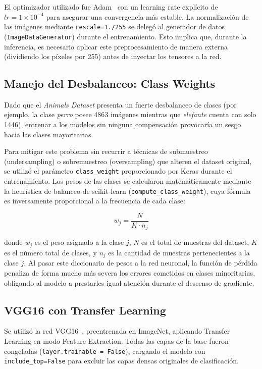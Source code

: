 \documentclass[1p,12pt]{elsarticle}
\begin{document}
El optimizador utilizado fue Adam~\cite{Kingma2015} con un learning rate
explícito de $lr = 1 \times 10^{-4}$ para asegurar una convergencia más
estable. La normalización de las imágenes mediante
\texttt{rescale=1./255} se delegó al generador de datos
(\texttt{ImageDataGenerator}) durante el entrenamiento. Esto implica que,
durante la inferencia, es necesario aplicar este preprocesamiento de manera
externa (dividiendo los píxeles por 255) antes de inyectar los tensores a la
red.

\subsection{Manejo del Desbalanceo: Class Weights}
\label{sub:class_weights}

Dado que el \textit{Animals Dataset} presenta un fuerte desbalanceo de clases
(por ejemplo, la clase \textit{perro} posee 4863 imágenes mientras que
\textit{elefante} cuenta con solo 1446), entrenar a los modelos sin ninguna
compensación provocaría un sesgo hacia las clases mayoritarias.

Para mitigar este problema sin recurrir a técnicas de submuestreo
(undersampling) o sobremuestreo (oversampling) que alteren el dataset original,
se utilizó el parámetro \texttt{class\_weight} proporcionado por Keras durante
el entrenamiento. Los pesos de las clases se calcularon matemáticamente mediante
la heurística de balanceo de scikit-learn (\texttt{compute\_class\_weight}),
cuya fórmula es inversamente proporcional a la frecuencia de cada clase:

\begin{equation}
\label{eq:class_weight}
w_j = \frac{N}{K \cdot n_j}
\end{equation}

donde $w_j$ es el peso asignado a la clase $j$, $N$ es el total de muestras del
dataset, $K$ es el número total de clases, y $n_j$ es la cantidad de muestras
pertenecientes a la clase $j$. Al pasar este diccionario de pesos a la red
neuronal, la función de pérdida penaliza de forma mucho más severa los errores
cometidos en clases minoritarias, obligando al modelo a prestarles igual
atención durante el descenso de gradiente.

\subsection{VGG16 con Transfer Learning}
\label{sub:vgg16}

Se utilizó la red VGG16~\cite{Simonyan2015}, preentrenada en ImageNet,
aplicando Transfer Learning en modo Feature Extraction. Todas las capas de la
base fueron congeladas (\texttt{layer.trainable = False}), cargando el modelo
con \texttt{include\_top=False} para excluir las capas densas originales de
clasificación.
\end{document}

